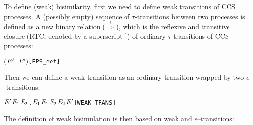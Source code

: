 To define (weak) bisimilarity, first we need to define
weak transitions of CCS processes.
A (possibly empty) sequence of $\tau$-transitions between
two processes is defined as a new binary relation 
($\overset{\epsilon}{\Longrightarrow}$), which is the
reflexive and transitive closure (RTC, denoted by a superscript $^*$)
of ordinary $\tau$-transitions of CCS processes:
\begin{alltt}
    \HOLTokenDefEquality{} \ensuremath{(}\HOLTokenLambda{} \ensuremath{\HOLBoundVar{E}\sp{\prime}}.  \HOLTokenTransBegin\HOLSymConst{\ensuremath{\tau}}\HOLTokenTransEnd \ensuremath{\HOLBoundVar{E}\sp{\prime}}\ensuremath{)}\HOLSymConst{\HOLTokenSupStar{}}\hfill{[EPS_def]}
\end{alltt}
Then we can define a weak transition as an ordinary transition wrapped by
two $\epsilon$-transitions:
\begin{alltt}
    \HOLTokenWeakTransBegin{}\HOLTokenWeakTransEnd \ensuremath{\HOLFreeVar{E}\sp{\prime}} \HOLTokenDefEquality{} \HOLSymConst{\HOLTokenExists{}}\ensuremath{\HOLBoundVar{E}\sb{\mathrm{1}}} \ensuremath{\HOLBoundVar{E}\sb{\mathrm{2}}}.  \HOLSymConst{\HOLTokenEPS} \ensuremath{\HOLBoundVar{E}\sb{\mathrm{1}}} \HOLSymConst{\HOLTokenConj{}} \ensuremath{\HOLBoundVar{E}\sb{\mathrm{1}}} \HOLTokenTransBegin{}\HOLTokenTransEnd \ensuremath{\HOLBoundVar{E}\sb{\mathrm{2}}} \HOLSymConst{\HOLTokenConj{}} \ensuremath{\HOLBoundVar{E}\sb{\mathrm{2}}} \HOLSymConst{\HOLTokenEPS} \ensuremath{\HOLFreeVar{E}\sp{\prime}}\hfill{[WEAK_TRANS]}
\end{alltt}
%
The definition of weak bisimulation is then based on weak and $\epsilon$--transitions:
